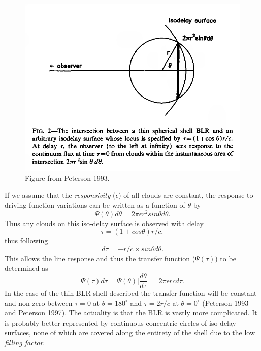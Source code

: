\documentclass[a4paper, 12pt, twoside]{article}
\begin{document}
\begin{figure}[t!]
\centering
\includegraphics[width=1.00\linewidth]{Figure/BLR_iso_delay.png}
\caption{Figure from Peterson 1993.}
\label{fig:BLR_iso_delay}
\end{figure}
If we assume that the \emph{responsivity} ($\epsilon$) of all clouds are constant, the response to driving function variations can be written as a function of $\theta$ by 
\begin{equation}
\Psi(\theta)d\theta = 2\pi\epsilon r^{2}sin\theta d\theta.
\label{eq:theta_response_function}
\end{equation}
Thus any clouds on this iso-delay surface is observed with delay
\begin{equation}
\tau = (1 + cos\theta)r/c,
\label{eq:cloud_delay}
\end{equation}
thus following
\begin{equation}
d\tau = -r/c\times sin\theta d\theta.
\label{eq:d_tau}
\end{equation}
This allows the line response and thus the transfer function ($\Psi(\tau)$) to be determined as
\begin{equation}
\Psi(\tau)d\tau = \Psi(\theta)\bigg|\frac{d\theta}{d\tau}\bigg| = 2\pi\epsilon rcd\tau.
\label{eq:d_tau}
\end{equation}
In the case of the thin BLR shell described the transfer function will be constant and non-zero between $\tau = 0$ at $\theta = 180^{\circ}$ and $\tau=2r/c$ at $\theta = 0^{\circ}$ (Peterson 1993 and Peterson 1997). The actuality is that the BLR is vastly more complicated. It is probably better represented by continuous concentric circles of iso-delay surfaces, none of which are covered along the entirety of the shell due to the low \emph{filling factor}. \\
\end{document}
